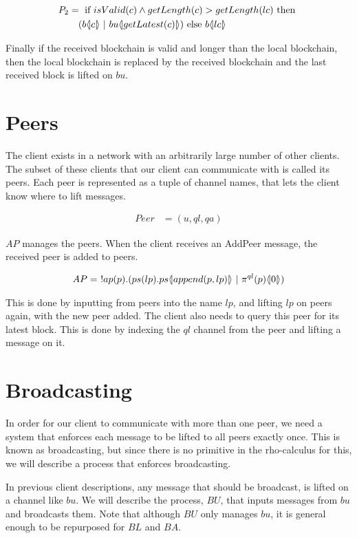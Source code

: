 \begin{align*}
	P_2 &=\text{ if }isValid(c) \land getLength(c) > getLength(lc)\text{ then }\\
	&\quad(b \langle \! | c | \! \rangle\ |\ bu  \langle \! | getLatest(c) | \! \rangle)\text{ else }b \langle \! | lc | \! \rangle
\end{align*}

Finally if the received blockchain is valid and longer than the local blockchain, then the local blockchain is replaced by the received blockchain and the last received block is lifted on $bu$.

\section{Peers}
The client exists in a network with an arbitrarily large number of other clients.
The subset of these clients that our client can communicate with is called its peers.
Each peer is represented as a tuple of channel names, that lets the client know where to lift messages.

\begin{align*}
    Peer &= (u, ql, qa)
\end{align*}

$AP$ manages the peers.
When the client receives an AddPeer message, the received peer is added to peers.

\begin{align*}
    AP &=\ !ap(p).(ps(lp).ps\lift{}{append(p,lp)}\ |\ \pi^{ql}(p)\lift{}{0})\\
\end{align*}

This is done by inputting from peers into the name $lp$, and lifting $lp$ on peers again, with the new peer added.
The client also needs to query this peer for its latest block.
This is done by indexing the $ql$ channel from the peer and lifting a message on it.

\section{Broadcasting} \label{broadcast}
In order for our client to communicate with more than one peer, we need a system that enforces each message to be lifted to all peers exactly once.
This is known as broadcasting, but since there is no primitive in the rho-calculus for this, we will describe a process that enforces broadcasting.

In previous client descriptions, any message that should be broadcast, is lifted on a channel like $bu$.
We will describe the process, $BU$, that inputs messages from $bu$ and broadcasts them.
Note that although $BU$ only manages $bu$, it is general enough to be repurposed for $BL$ and $BA$.

